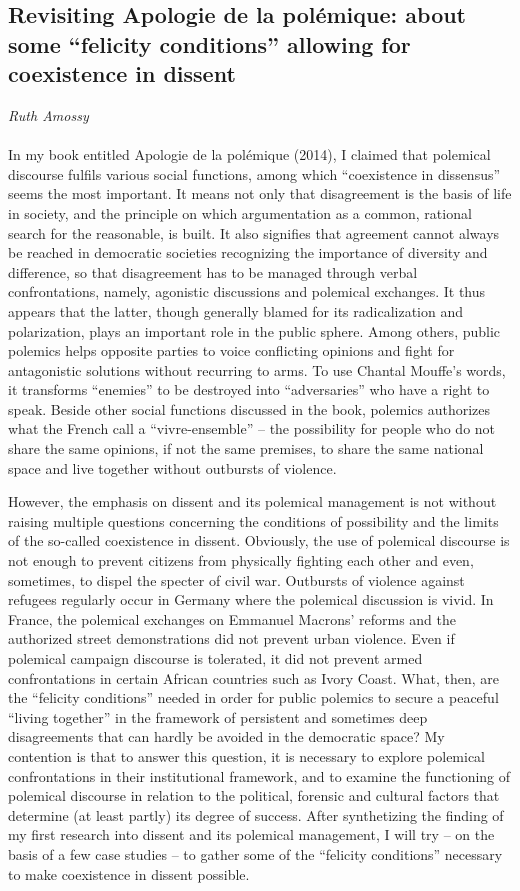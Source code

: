 \subsection*{Revisiting Apologie de la polémique: about some “felicity conditions” allowing for coexistence in dissent}
\emph{Ruth Amossy}
\\\\
In my book entitled Apologie de la polémique (2014), I claimed that polemical discourse fulfils various social functions, among which “coexistence in dissensus” seems the most important. It means not only that disagreement is the basis of life in society, and the principle on which argumentation as a common, rational search for the reasonable, is built. It also signifies that agreement cannot always be reached in democratic societies recognizing the importance of diversity and difference, so that disagreement has to be managed through verbal confrontations, namely, agonistic discussions and polemical exchanges. It thus appears that the latter, though generally blamed for its radicalization and polarization, plays an important role in the public sphere. Among others, public polemics helps opposite parties to voice conflicting opinions and fight for antagonistic solutions without recurring to arms. To use Chantal Mouffe’s words, it transforms “enemies” to be destroyed into “adversaries” who have a right to speak. Beside other social functions discussed in the book, polemics authorizes what the French call a “vivre-ensemble” – the possibility for people who do not share the same opinions, if not the same premises, to share the same national space and live together without outbursts of violence.

However, the emphasis on dissent and its polemical management is not without raising multiple questions concerning the conditions of possibility and the limits of the so-called coexistence in dissent. Obviously, the use of polemical discourse is not enough to prevent citizens from physically fighting each other and even, sometimes, to dispel the specter of civil war. Outbursts of violence against refugees regularly occur in Germany where the polemical discussion is vivid. In France, the polemical exchanges on Emmanuel Macrons’ reforms and the authorized street demonstrations did not prevent urban violence. Even if polemical campaign discourse is tolerated, it did not prevent armed confrontations in certain African countries such as Ivory Coast. What, then, are the “felicity conditions” needed in order for public polemics to secure a peaceful “living together” in the framework of persistent and sometimes deep disagreements that can hardly be avoided in the democratic space? My contention is that to answer this question, it is necessary to explore polemical confrontations in their institutional framework, and to examine the functioning of polemical discourse in relation to the political, forensic and cultural factors that determine (at least partly) its degree of success. After synthetizing the finding of my first research into dissent and its polemical management, I will try – on the basis of a few case studies – to gather some of the “felicity conditions” necessary to make coexistence in dissent possible.

